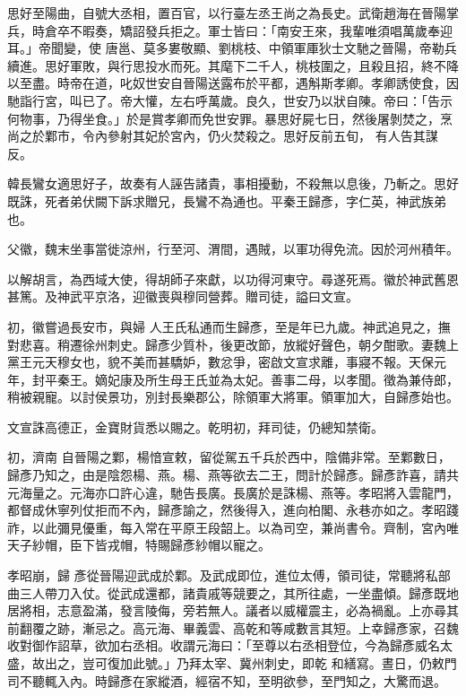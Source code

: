 \begin{pinyinscope}
 思好至陽曲，自號大丞相，置百官，以行臺左丞王尚之為長史。武衛趙海在晉陽掌兵，時倉卒不暇奏，矯詔發兵拒之。軍士皆曰：「南安王來，我輩唯須唱萬歲奉迎耳。」帝聞變，使
 唐邕、莫多婁敬顯、劉桃枝、中領軍厙狄士文馳之晉陽，帝勒兵續進。思好軍敗，與行思投水而死。其麾下二千人，桃枝圍之，且殺且招，終不降以至盡。時帝在道，叱奴世安自晉陽送露布於平都，遇斛斯孝卿。孝卿誘使食，因馳詣行宮，叫已了。帝大懽，左右呼萬歲。良久，世安乃以狀自陳。帝曰：「告示何物事，乃得坐食。」於是賞孝卿而免世安罪。暴思好屍七日，然後屠剝焚之，烹尚之於鄴市，令內參射其妃於宮內，仍火焚殺之。思好反前五旬，
 有人告其謀反。



 韓長鸞女適思好子，故奏有人誣告諸貴，事相擾動，不殺無以息後，乃斬之。思好既誅，死者弟伏闕下訴求贈兄，長鸞不為通也。平秦王歸彥，字仁英，神武族弟也。



 父徽，魏末坐事當徙涼州，行至河、渭間，遇賊，以軍功得免流。因於河州積年。



 以解胡言，為西域大使，得胡師子來獻，以功得河東守。尋遂死焉。徽於神武舊恩甚篤。及神武平京洛，迎徽喪與穆同營葬。贈司徒，謚曰文宣。



 初，徽嘗過長安市，與婦
 人王氏私通而生歸彥，至是年已九歲。神武追見之，撫對悲喜。稍遷徐州刺史。歸彥少質朴，後更改節，放縱好聲色，朝夕酣歌。妻魏上黨王元天穆女也，貌不美而甚驕妒，數忿爭，密啟文宣求離，事寢不報。天保元年，封平秦王。嫡妃康及所生母王氏並為太妃。善事二母，以孝聞。徵為兼侍郎，稍被親寵。以討侯景功，別封長樂郡公，除領軍大將軍。領軍加大，自歸彥始也。



 文宣誅高德正，金寶財貨悉以賜之。乾明初，拜司徒，仍總知禁衛。



 初，濟南
 自晉陽之鄴，楊愔宣敕，留從駕五千兵於西中，陰備非常。至鄴數日，歸彥乃知之，由是陰怨楊、燕。楊、燕等欲去二王，問計於歸彥。歸彥詐喜，請共元海量之。元海亦口許心違，馳告長廣。長廣於是誅楊、燕等。孝昭將入雲龍門，都督成休寧列仗拒而不內，歸彥諭之，然後得入，進向柏閣、永巷亦如之。孝昭踐祚，以此彌見優重，每入常在平原王段韶上。以為司空，兼尚書令。齊制，宮內唯天子紗帽，臣下皆戎帽，特賜歸彥紗帽以寵之。



 孝昭崩，歸
 彥從晉陽迎武成於鄴。及武成即位，進位太傅，領司徒，常聽將私部曲三人帶刀入仗。從武成還都，諸貴戚等競要之，其所往處，一坐盡傾。歸彥既地居將相，志意盈滿，發言陵侮，旁若無人。議者以威權震主，必為禍亂。上亦尋其前翻覆之跡，漸忌之。高元海、畢義雲、高乾和等咸數言其短。上幸歸彥家，召魏收對御作詔草，欲加右丞相。收謂元海曰：「至尊以右丞相登位，今為歸彥威名太盛，故出之，豈可復加此號。」乃拜太宰、冀州刺史，即乾
 和繕寫。晝日，仍敕門司不聽輒入內。時歸彥在家縱酒，經宿不知，至明欲參，至門知之，大驚而退。




\end{pinyinscope}
